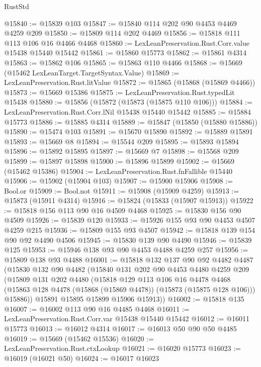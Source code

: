\begin{lexlean}{RustStd}
\begin{coremodule}
@15840 := @15839 @103
@15847 := @15840 @114 @202 @90 @4453 @4469 @4259 @209
@15850 := @15809 @114 @202 @4469
@15856 := @15818 @111 @113 @106 @16 @4466 @4468
@15860 := LexLeanPreservation.Rust.Corr.value @15438 @15440 @15442
@15861 := @15860 @15773
@15862 := @15861 @4314
@15863 := @15862 @106
@15865 := @15863 @110 @4466
@15868 := @15669 (@15462 LexLeanTarget.TargetSyntax.Value)
@15869 := LexLeanPreservation.Rust.litValue
@15872 := @15865 (@15868 (@15869 @4466))
@15873 := @15669 @15386
@15875 := LexLeanPreservation.Rust.typedLit @15438
@15880 := @15856 (@15872 (@15873 (@15875 @110 @106)))
@15884 := LexLeanPreservation.Rust.Corr.lNil @15438 @15440 @15442
@15885 := @15884 @15773
@15886 := @15885 @4314
@15889 := @15847 (@15850 (@15880 @15886))
@15890 := @15474 @103
@15891 := @15670 @15890
@15892 := @15889 @15891
@15893 := @15669 @8
@15894 := @15544 @209
@15895 := @15893 @15894
@15896 := @15892 @15895
@15897 := @15669 @7
@15898 := @15568 @209
@15899 := @15897 @15898
@15900 := @15896 @15899
@15902 := @15669 (@15462 @15386)
@15904 := LexLeanPreservation.Rust.fnFallible @15440
@15906 := @15902 (@15904 @103)
@15907 := @15900 @15906
@15908 := Bool.or
@15909 := Bool.not
@15911 := @15908 (@15909 @4259)
@15913 := @15873 (@15911 @4314)
@15916 := @15824 (@15833 (@15907 @15913))
@15922 := @15818 @156 @113 @90 @16 @4509 @4468
@15925 := @15830 @156 @90 @4509
@15926 := @15839 @120
@15933 := @15926 @155 @93 @90 @4453 @4507 @4259 @215
@15936 := @15809 @155 @93 @4507
@15942 := @15818 @139 @154 @90 @92 @4490 @4506
@15945 := @15830 @139 @90 @4490
@15946 := @15839 @125
@15953 := @15946 @138 @93 @90 @4453 @4488 @4259 @257
@15956 := @15809 @138 @93 @4488
@16001 := @15818
    @132
    @137
    @90
    @92
    @4482
    @4487
    (@15830
      @132
      @90
      @4482
      (@15840
        @131
        @202
        @90
        @4453
        @4480
        @4259
        @209
        (@15809
          @131
          @202
          @4480
          (@15818
            @129
            @113
            @106
            @16
            @4478
            @4468
            (@15863 @128 @4478 (@15868 (@15869 @4478)) (@15873 (@15875 @128 @106)))
            @15886))
        @15891
        @15895
        @15899
        @15906
        @15913))
@16002 := @15818 @135
@16007 := @16002 @113 @90 @16 @4485 @4468
@16011 := LexLeanPreservation.Rust.Corr.var @15438 @15440 @15442
@16012 := @16011 @15773
@16013 := @16012 @4314
@16017 := @16013 @50 @90 @50 @4485
@16019 := @15669 (@15462 @15536)
@16020 := LexLeanPreservation.Rust.ctxLookup
@16021 := @16020 @15773
@16023 := @16019 (@16021 @50)
@16024 := @16017 @16023

\end{coremodule}
\end{lexlean}
